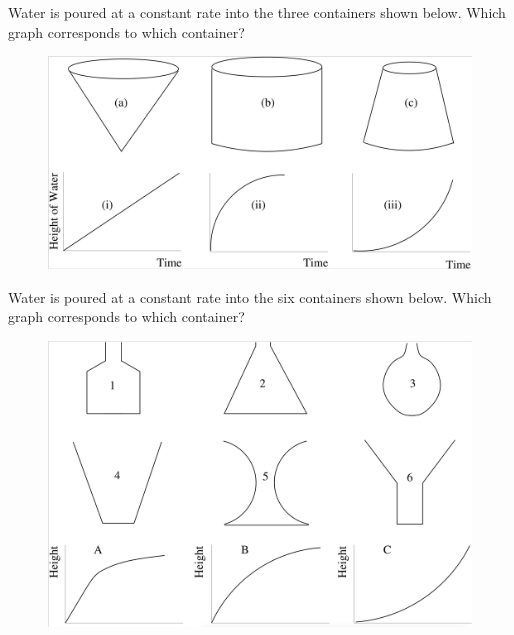 \documentclass{ximera}
\begin{document}
\newpage


\begin{problem} \label{graphicDetails2}
Water is poured at a constant rate into the three containers shown
below. Which graph corresponds to which container?

\begin{figure}[h]
\begin{center}
\includegraphics[width=\textwidth]{elementaryActivities/graphics/GraphicDetails2.png}
\end{center}
\end{figure}


\end{problem}

\newpage

\begin{problem} \label{graphicDetails3}
Water is poured at a constant rate into the six containers shown
below. Which graph corresponds to which container?

\begin{figure}[h]
\begin{center}
\includegraphics[width=\textwidth]{elementaryActivities/graphics/GraphicDetails3.png}
\end{center}
\end{figure}


\end{problem}
\end{document}
